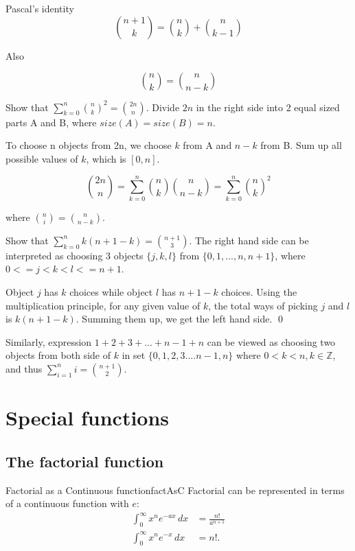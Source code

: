 \documentclass[11pt,a4paper,fleqn]{article}
\numberwithin{equation}{section}
\begin{document}
\begin{fact}{Pascal’s identity}{}
    \[
    \binom{n+1}{k} = \binom{n}{k} + \binom{n}{k-1}
    \]
\end{fact}

Also

\[
{n \choose k} = {n \choose n-k}
\]

\begin{exec}
    Show that $\sum_{k=0}^{n}{n \choose k}^2 = {2n \choose n}.$
    \tcblower
    Divide $2n$ in the right side into 2 equal sized parts A and B, where $size(A)=size(B)=n$.
    
    To choose n objects from 2n, we choose $k$ from A and $n-k$ from B.
    Sum up all possible values of $k$, which is $[0,n]$.
    
    \[
    {2n \choose n} = \sum_{k=0}^{n}{n \choose k}{n \choose n-k} = \sum_{k=0}^{n}{n \choose k}^2
    \]
    
    where ${n \choose i} = {n \choose n-k}$.
\end{exec}

\begin{exec}
    Show that $\sum_{k=0}^{n} k(n+1-k)={n+1 \choose 3}$.
    \tcblower
    The right hand side can be interpreted as choosing 3 objects $\{j,k,l\}$ from $\{0,1,...,n,n+1\}$, where $0<=j<k<l<=n+1$.
    
    Object $j$ has $k$ choices while object $l$ has $n+1-k$ choices. Using the multiplication principle, for any given value of $k$, the total ways of picking $j$ and $l$ is $k(n+1-k)$. Summing them up, we get the left hand side.
    \qed
    
    Similarly, expression $1+2+3+...+n-1+n$ can be viewed as choosing two objects from both side of $k$ in set $\{0,1,2,3....n-1,n\}$ where $0<k<n, k \in \mathbb{Z}$, and thus $\sum_{i=1}^{n}i={n+1 \choose 2}$.
\end{exec}


\section{Special functions}

\subsection{The factorial function}

\begin{fact}{Factorial as a Continuous function}{factAsC}
    Factorial can be represented in terms of a continuous function with $e$:
    \begin{align*}
        \int_{0}^{\infty}x^{n}e^{-a x}\,dx&=\frac{n!}{a^{n+1}} \\
        \int_{0}^{\infty}x^{n}e^{-x}\,dx&=n!.
    \end{align*}
\end{fact}
\end{document}
